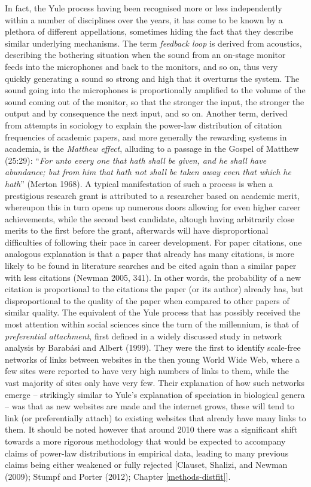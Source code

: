 \documentclass[
  12pt,
  a4paper, twoside]{book}
\begin{document}
In fact, the Yule process having been recognised more or less independently within a number of disciplines over the years, it has come to be known by a plethora of different appellations, sometimes hiding the fact that they describe similar underlying mechanisms. The term \emph{feedback loop} is derived from acoustics, describing the bothering situation when the sound from an on-stage monitor feeds into the microphones and back to the monitors, and so on, thus very quickly generating a sound so strong and high that it overturns the system. The sound going into the microphones is proportionally amplified to the volume of the sound coming out of the monitor, so that the stronger the input, the stronger the output and by consequence the next input, and so on. Another term, derived from attempts in sociology to explain the power-law distribution of citation frequencies of academic papers, and more generally the rewarding systems in academia, is the \emph{Matthew effect}, alluding to a passage in the Gospel of Matthew (25:29): ``\emph{For unto every one that hath shall be given, and he shall have abundance; but from him that hath not shall be taken away even that which he hath}'' (Merton 1968). A typical manifestation of such a process is when a prestigious research grant is attributed to a researcher based on academic merit, whereupon this in turn opens up numerous doors allowing for even higher career achievements, while the second best candidate, altough having arbitrarily close merits to the first before the grant, afterwards will have disproportional difficulties of following their pace in career development. For paper citations, one analogous explanation is that a paper that already has many citations, is more likely to be found in literature searches and be cited again than a similar paper with less citations (Newman 2005, 341). In other words, the probability of a new citation is proportional to the citations the paper (or its author) already has, but disproportional to the quality of the paper when compared to other papers of similar quality. The equivalent of the Yule process that has possibly received the most attention within social sciences since the turn of the millennium, is that of \emph{preferential attachment}, first defined in a widely discussed study in network analysis by Barabási and Albert (1999). They were the first to identify scale-free networks of links between websites in the then young World Wide Web, where a few sites were reported to have very high numbers of links to them, while the vast majority of sites only have very few. Their explanation of how such networks emerge -- strikingly similar to Yule's explanation of speciation in biological genera -- was that as new websites are made and the internet grows, these will tend to link (or preferentially attach) to existing websites that already have many links to them. It should be noted however that around 2010 there was a significant shift towards a more rigorous methodology that would be expected to accompany claims of power-law distributions in empirical data, leading to many previous claims being either weakened or fully rejected {[}Clauset, Shalizi, and Newman (2009); Stumpf and Porter (2012); Chapter \ref{methods-distfit}{]}.
\end{document}
